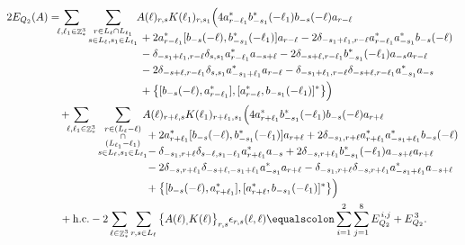 \documentclass[sn-mathphys, Numbered ,a4paper]{sn-jnl}%
\DeclareMathOperator{\Z}{\mathbb{Z}}
\theoremstyle{plain}
\theoremstyle{definition}
\theoremstyle{remark}
\theoremstyle{plain}
\theoremstyle{definition}
\theoremstyle{remark}
\begin{document}
\begin{alignat}{2}
	2E_{Q_2}(A) &=
	\!\!\!\sum\limits_{\ell,\ell_1 \in \Z^3_*}\sum\limits_{\substack{r\in L_{\ell} \cap L_{\ell_1}\\ s \in L_{\ell},s_1\in L_{\ell_1}}} \!\!\!\begin{aligned}[t] &A(\ell)_{r,s}K(\ell_1)_{r,s_1}\Big( 4a^*_{r-\ell_1}b^*_{-s_1}(-\ell_1)b_{-s}(-\ell)a_{r-\ell} \nonumber\\ 
		&\;+ 2a^*_{r-\ell_1}[b_{-s}(-\ell),b^*_{-s_1}(-\ell_1)]a_{r-\ell}-2\delta_{-s_1+\ell_1,r-\ell} a^*_{r-\ell_1}a^*_{-s_1}b_{-s}(-\ell)\nonumber\\
		&\;- \delta_{-s_1+\ell_1,r-\ell}\delta_{s,s_1}a^*_{r-\ell_1}a_{-s+\ell} - 2\delta_{-s+\ell,r-\ell_1}b^*_{-s_1}(-\ell_1)a_{-s}a_{r-\ell} \nonumber\\
		&\;-2\delta_{-s+\ell,r-\ell_1}\delta_{s,s_1}a^*_{-s_1+\ell_1} a_{r-\ell} - \delta_{-s_1+\ell_1,r-\ell}\delta_{-s+\ell,r-\ell_1}a^*_{-s_1}a_{-s} \nonumber\\
		&\;+ \big\{ [b_{-s}(-\ell),a^*_{r-\ell_1}],[a^*_{r-\ell}, b_{-s_1}(-\ell_1)]^*\big\}  \Big)    
	\end{aligned}\\
	&\quad +\!\!\!\sum\limits_{\ell,\ell_1 \in \Z^3_*}\sum\limits_{\substack{r\in (L_{\ell}-\ell)\\ \cap \\(L_{\ell_1}-\ell_1)\\ s \in L_{\ell},s_1\in L_{\ell_1}}}\!\!\!\!\!\begin{aligned}[t] &A(\ell)_{r+\ell,s}K(\ell_1)_{r+\ell_1,s_1}\Big(4a^*_{r+\ell_1}b^*_{-s_1}(-\ell_1)b_{-s}(-\ell)a_{r+\ell} \nonumber\\
		&\;+ 2a^*_{r+\ell_1}[b_{-s}(-\ell),b^*_{-s_1}(-\ell_1)]a_{r+\ell}+ 2 \delta_{-s_1, r+\ell}a^*_{r+\ell_1}a^*_{-s_1+\ell_1}b_{-s}(-\ell)\nonumber\\
		&\;-\delta_{-s_1,r+\ell}\delta_{s-\ell,s_1-\ell_1}a^*_{r+\ell_1}a_{-s} + 2\delta_{-s,r+\ell_1}b^*_{-s_1}(-\ell_1)a_{-s+\ell}a_{r+\ell} \nonumber\\
		&\;-2\delta_{-s,r+\ell_1}\delta_{-s+\ell,-s_1+\ell_1}a^*_{-s_1}a_{r+\ell} - \delta_{-s_1,r+\ell}\delta_{-s,r+\ell_1}a^*_{-s_1+\ell_1}a_{-s+\ell}\nonumber\\
		&\;+ \big\{ [b_{-s}(-\ell),a^*_{r+\ell_1}],[a^*_{r+\ell}, b_{-s_1}(-\ell_1)]^*\big\} \Big)   
	\end{aligned}\\
	&\phantom{=\;}+\mathrm{h.c.} -2\sum\limits_{\ell \in \Z^3_*}\sum\limits_{r,s \in L_{\ell}}\big\{ A(\ell)_,K(\ell)\big\}_{r,s}\epsilon_{r,s}(\ell,\ell)\equalscolon \sum\limits_{i=1}^{2}\sum\limits_{j=1}^{8} E_{Q_2}^{\,i,j}\nonumber + E_{Q_2}^{\, 3}.
\end{alignat}
\end{document}
